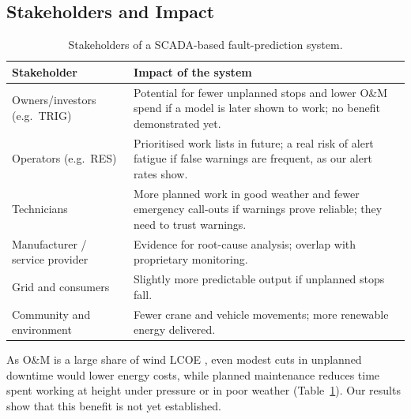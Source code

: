 \documentclass[12pt,a4paper]{article}
\begin{document}
	\subsection{Stakeholders and Impact}
	\begin{table}[htbp]
	\centering
	\small
	\begin{tabularx}{\linewidth}{@{}lX@{}}
	\toprule
	\textbf{Stakeholder} & \textbf{Impact of the system} \\
	\midrule
	Owners/investors (e.g.\ TRIG) & Potential for fewer unplanned stops and lower O\&M spend if a model is later shown to work; no benefit demonstrated yet. \\
	Operators (e.g.\ RES) & Prioritised work lists in future; a real risk of alert fatigue if false warnings are frequent, as our alert rates show. \\
	Technicians & More planned work in good weather and fewer emergency call-outs if warnings prove reliable; they need to trust warnings. \\
	Manufacturer / service provider & Evidence for root-cause analysis; overlap with proprietary monitoring. \\
	Grid and consumers & Slightly more predictable output if unplanned stops fall. \\
	Community and environment & Fewer crane and vehicle movements; more renewable energy delivered. \\
	\bottomrule
	\end{tabularx}
	\caption{Stakeholders of a SCADA-based fault-prediction system.}
	\label{tab:stake}
	\end{table}

	As O\&M is a large share of wind LCOE \cite{irena2012}, even modest cuts in unplanned downtime would lower energy costs, while planned maintenance reduces time spent working at height under pressure or in poor weather (Table~\ref{tab:stake}). Our results show that this benefit is not yet established.
\end{document}
